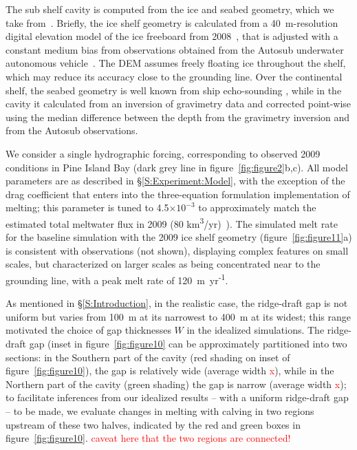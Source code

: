 \documentclass[draft]{agujournal2019}
\newcommand{\red}[1]{\textcolor{red}{#1}}
\begin{document}
The sub shelf cavity is computed from the ice and seabed geometry, which we take from~. Briefly, the ice shelf geometry is calculated from a 40~m-resolution digital elevation model of the ice freeboard from 2008~\cite{Korona2009Photogrammetry}, that is adjusted with a constant medium bias from observations obtained from the Autosub underwater autonomous vehicle~\cite{Jenkins2010NatureGeo}. The DEM assumes freely floating ice throughout the shelf, which may reduce its accuracy close to the grounding line. Over the continental shelf, the seabed geometry is well known from ship echo-sounding \cite{Dutrieux2014Science}, while in the cavity it calculated from an inversion of gravimetry data and corrected point-wise using the median difference between the depth from the gravimetry inversion and from the Autosub observations. 

We consider a single hydrographic forcing, corresponding to observed 2009 conditions in Pine Island Bay (dark grey line in figure~\ref{fig:figure2}b,c). All model parameters are as described in \S\ref{S:Experiment:Model}, with the exception of the drag coefficient that enters into the three-equation formulation implementation of melting; this parameter is tuned to 4.5$\times10^{-3}$ to approximately match the estimated total meltwater flux in 2009 (80 km\textsuperscript{3}/yr)~\cite{Dutrieux2014Science}). The simulated melt rate for the baseline simulation with the 2009 ice shelf geometry (figure~\ref{fig:figure11}a) is consistent with observations (not shown), displaying complex features on small scales, but characterized on larger scales as being concentrated near to the grounding line, with a peak melt rate of 120~m~yr\textsuperscript{-1}.

As mentioned in \S\ref{S:Introduction}, in the realistic case, the ridge-draft gap is not uniform but varies from 100~m at its narrowest to 400~m at its widest; this range motivated the choice of gap thicknesses $W$ in the idealized simulations. The ridge-draft gap (inset in figure~\ref{fig:figure10} can be approximately partitioned into two sections: in the Southern part of the cavity (red shading on inset of figure~\ref{fig:figure10}), the gap is relatively wide (average width \red{x}), while in the Northern part of the cavity (green shading) the gap is narrow (average width \red{x}); to facilitate inferences from our idealized results -- with a uniform ridge-draft gap -- to be made, we evaluate changes in melting with calving in two regions upstream of these two halves, indicated by the red and green boxes in figure~\ref{fig:figure10}. \red{caveat here that the two regions are connected!}
\end{document}

